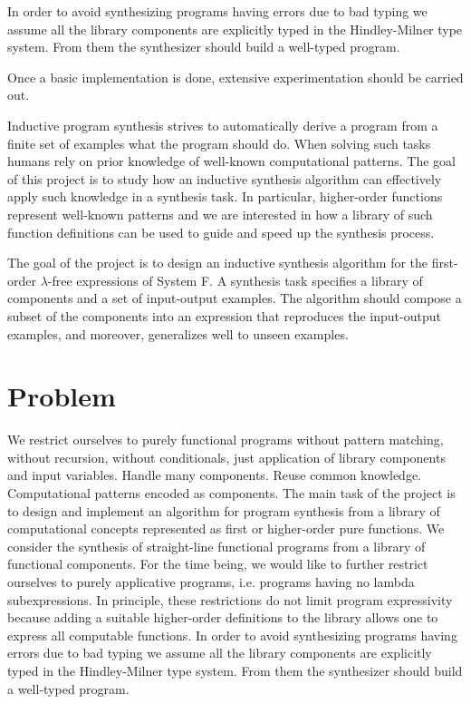  In order to avoid synthesizing programs having errors due to bad typing we assume all the library components are explicitly typed in the Hindley-Milner type system.  From them the synthesizer should build a well-typed program.

Once a basic implementation is done, extensive experimentation should be carried out.

Inductive program synthesis strives to automatically derive a program from a finite set of examples what the program should do.  When solving such tasks humans rely on prior knowledge of well-known computational patterns. The goal of this project is to study how an inductive synthesis algorithm can effectively apply such knowledge in a synthesis task. In particular, higher-order functions represent well-known patterns and we are interested in how a library of such function definitions can be used to guide and speed up the synthesis process.

The goal of the project is to design an inductive synthesis algorithm for the first-order $\lambda$-free expressions of System F. A synthesis task specifies a library of components and a set of input-output examples. The algorithm should compose a subset of the components into an expression that reproduces the input-output examples, and moreover, generalizes well to unseen examples.

\section{Problem}
We restrict ourselves to purely functional programs without pattern matching, without recursion, without conditionals, just application of library components and input variables. Handle many components. Reuse common knowledge. Computational patterns encoded as components.
The main task of the project is to design and implement an algorithm for program synthesis from a library of computational concepts represented as first or higher-order pure functions.
We consider the synthesis of straight-line functional programs from a library of functional components.  For the time being, we would like to further restrict ourselves to purely applicative programs, i.e. programs having no lambda subexpressions. In principle, these restrictions do not limit program expressivity because adding a suitable higher-order definitions to the library allows one to express all computable functions.  In order to avoid synthesizing programs having errors due to bad typing we assume all the library components are explicitly typed in the Hindley-Milner type system.  From them the synthesizer should build a well-typed program.






